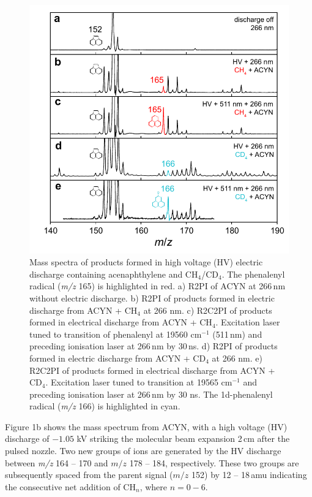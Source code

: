 \documentclass[journal=jacsat,manuscript=article,layout=onecolumn]{achemso}
\begin{document}
\begin{figure}[h!]
	\includegraphics[width=15cm]{Figures/Figure1}
	\caption{Mass spectra of products formed in high voltage (HV) electric discharge containing acenaphthylene and CH$_4$/CD$_4$. The phenalenyl radical (\textit{m/z} 165) is highlighted in red. a) R2PI of ACYN at 266\,nm without electric discharge. b) R2PI of products formed in electric discharge from ACYN + CH$_4$ at 266 nm. c) R2C2PI of products formed in electrical discharge from ACYN + CH$_4$. Excitation laser tuned to transition of phenalenyl at 19560 cm$^{-1}$ (511\,nm) and preceding ionisation laser at 266\,nm by 30\,ns. d) R2PI of products formed in electric discharge from ACYN + CD$_4$ at 266 nm. e) R2C2PI of products formed in electrical discharge from ACYN + CD$_4$. Excitation laser tuned to transition at 19565 cm$^{-1}$ and preceding ionisation laser at 266\,nm by 30 ns. The 1d-phenalenyl radical (\textit{m/z} 166) is highlighted in cyan.}
	\label{fig1}
\end{figure}

Figure 1b shows the mass spectrum from ACYN, with a high voltage (HV) discharge of $-1.05$ kV striking the molecular beam expansion 2\,cm after the pulsed nozzle. Two new groups of ions are generated by the HV discharge between \textit{m/z} 164 – 170 and $m/z$ 178 – 184, respectively. These two groups are subsequently spaced from the parent signal ($m/z$ 152) by 12 – 18\,amu indicating the consecutive net addition of CH$_n$, where $n=0-6$.
\end{document}
